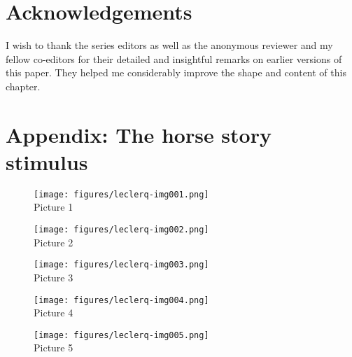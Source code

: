 \documentclass[output=paper,colorlinks,citecolor=brown,modfonts,nonflat]{../langscibook}
\begin{document}
\section*{Acknowledgements}

I wish to thank the series editors as well as the anonymous reviewer and my fellow co-editors for their detailed and insightful remarks on earlier versions of this paper. They helped me considerably improve the shape and content of this chapter.

{\sloppy\printbibliography[heading=subbibliography,notkeyword=this]}

\section*{Appendix: The horse story stimulus \citep{Hickmann1982}}

  
\begin{figure}
\texttt{[image: figures/leclerq-img001.png]}\\
Picture 1
\end{figure}




\begin{figure}
\texttt{[image: figures/leclerq-img002.png]}\\
Picture 2
\end{figure}


\begin{figure}
\texttt{[image: figures/leclerq-img003.png]}\\
Picture 3
\end{figure}




\begin{figure}
\texttt{[image: figures/leclerq-img004.png]}\\
Picture 4
\end{figure}

\begin{figure}
\texttt{[image: figures/leclerq-img005.png]}\\
Picture 5
\end{figure}
\end{document}
